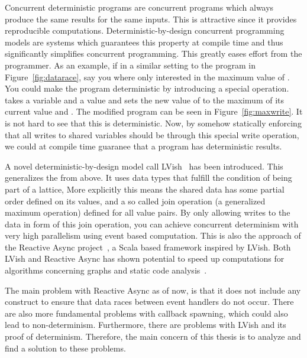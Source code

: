 Concurrent deterministic programs are concurrent programs which always produce
the same results for the same inputs. This is attractive since it provides
reproducible computations.  Deterministic-by-design concurrent programming
models are systems which guarantees this property at compile time and thus
significantly simplifies concurrent programming. This greatly eases effort
from the programmer. As an example, if in a similar setting to the program in
Figure~\ref{fig:datarace}, say you where only interested in the maximum value of
. You could make the program deterministic by introducing a special
 operation.  takes a variable  and a
value  and sets the new value of  to the maximum of its current
value and . The modified program can be seen in
Figure~\ref{fig:maxwrite}. It is not hard to see that this is deterministic.
Now, by somehow statically enforcing that all writes to shared variables should be
through this special write operation, we could at compile time guaranee that a
program has deterministic results.

\begin{figure}
  \centering
\end{figure}

A novel deterministic-by-design model call LVish~\parencite{kuper2013lvars,
kuper2014freeze} has been introduced. This generalizes the  from
above. It uses data types that fulfill the condition of being part of a lattice,
More explicitly this means the shared data has some partial order defined on its
values, and a so called join operation (a generalized maximum operation) defined
for all value pairs. By only allowing writes to the data in form of this join
operation, you can achieve concurrent determinism with very high parallelism
using event based computation. This is also the approach of the Reactive Async
project~\parencite{conf/scala/HallerGES16}, a Scala based framework inspired by
LVish. Both LVish and Reactive Async has shown potential to speed up
computations for algorithms concerning graphs and static code
analysis~\parencite{kuper2014freeze,conf/scala/HallerGES16}.

The main problem with Reactive Async as of now, is that it does not include any
construct to ensure that data races between event handlers do not occur.
There are also more fundamental problems with callback spawning,
which could also lead to non-determinism. Furthermore, there are problems with
LVish and its proof of determinism. Therefore, the main concern of this thesis
is to analyze and find a solution to these problems.

